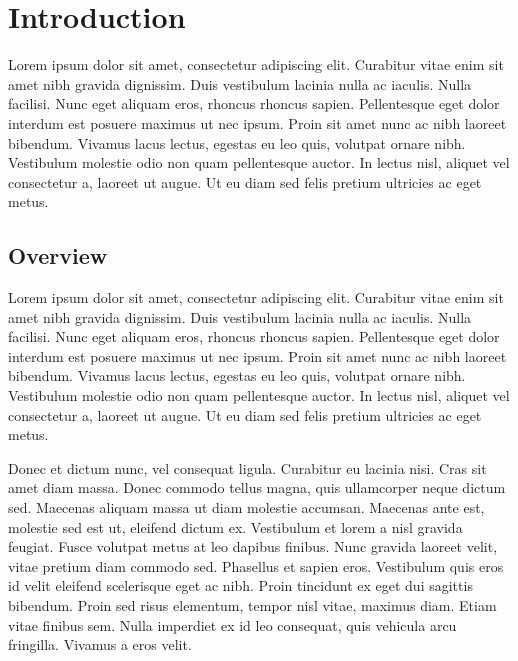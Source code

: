 \chapter{Introduction}

Lorem ipsum dolor sit amet, consectetur \cite{knuth-fa} adipiscing elit. Curabitur vitae enim sit amet nibh gravida dignissim. Duis vestibulum lacinia nulla ac iaculis. Nulla facilisi. Nunc eget aliquam eros, rhoncus rhoncus sapien. Pellentesque eget dolor interdum est posuere maximus ut nec ipsum. Proin sit amet nunc ac nibh laoreet bibendum. Vivamus lacus lectus, egestas eu leo quis, volutpat ornare nibh. Vestibulum molestie odio non quam pellentesque auctor. In lectus nisl, aliquet vel consectetur a, laoreet ut augue. Ut eu diam sed felis pretium ultricies ac eget metus.

\section{Overview}

Lorem ipsum dolor sit amet, consectetur \cite{knuth-fa} adipiscing elit. Curabitur vitae enim sit amet nibh gravida dignissim. Duis vestibulum lacinia nulla ac iaculis. Nulla facilisi. Nunc eget aliquam eros, rhoncus rhoncus sapien. Pellentesque eget dolor interdum est posuere maximus ut nec ipsum. Proin sit amet nunc ac nibh laoreet bibendum. Vivamus lacus lectus, egestas eu leo quis, volutpat ornare nibh. Vestibulum molestie odio non quam pellentesque auctor. In lectus nisl, aliquet vel consectetur a, laoreet ut augue. Ut eu diam sed felis pretium ultricies ac eget metus.

Donec et dictum nunc, vel consequat ligula. Curabitur eu lacinia nisi. Cras sit amet diam massa. Donec commodo tellus magna, quis ullamcorper neque dictum sed. Maecenas aliquam massa ut diam molestie accumsan. Maecenas ante est, molestie sed est ut, eleifend dictum ex. Vestibulum et lorem a nisl gravida feugiat. Fusce volutpat metus at leo dapibus finibus. Nunc gravida laoreet velit, vitae pretium diam commodo sed. Phasellus et sapien eros. Vestibulum quis eros id velit eleifend scelerisque eget ac nibh. Proin tincidunt ex eget dui sagittis bibendum. Proin sed risus elementum, tempor nisl vitae, maximus diam. Etiam vitae finibus sem. Nulla imperdiet ex id leo consequat, quis vehicula arcu fringilla. Vivamus a eros velit.


